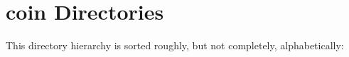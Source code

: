 \section{coin Directories}
This directory hierarchy is sorted roughly, but not completely, alphabetically:\begin{CompactList}
\item {}
\end{CompactList}
